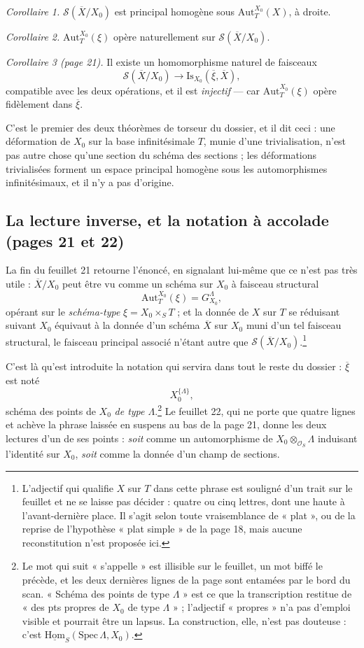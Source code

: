 \documentclass[11pt,a4paper]{article}
\begin{document}
\emph{Corollaire 1.} $\mathcal{S}(\overline{X}/X_{0})$ est principal homogène
sous $\mathrm{Aut}^{X_0}_{T}(X)$, à droite.

\emph{Corollaire 2.} $\mathrm{Aut}^{X_0}_{T}(\xi)$ opère naturellement sur
$\mathcal{S}(\overline{X}/X_{0})$.

\emph{Corollaire 3 (page 21).} Il existe un homomorphisme naturel de faisceaux
\[
  \mathcal{S}(\overline{X}/X_{0}) \longrightarrow
  \mathrm{Is}_{X_{0}}(\overline{\xi}, \overline{X}) ,
\]
compatible avec les deux opérations, et il est \emph{injectif} — car
$\mathrm{Aut}^{X_0}_{T}(\xi)$ opère fidèlement dans $\overline{\xi}$.

C'est le premier des deux théorèmes de torseur du dossier, et il dit ceci : une
déformation de $X_0$ sur la base infinitésimale $T$, munie d'une trivialisation,
n'est pas autre chose qu'une section du schéma des sections ; les déformations
trivialisées forment un espace principal homogène sous les automorphismes
infinitésimaux, et il n'y a pas d'origine.

\subsection*{La lecture inverse, et la notation à accolade (pages 21 et 22)}

La fin du feuillet 21 retourne l'énoncé, en signalant lui-même que ce n'est pas
très utile : $\overline{X}/X_{0}$ peut être vu comme un schéma sur $X_0$ à
faisceau structural
\[
  \mathrm{Aut}^{X_0}_{T}(\xi) = G^{\Lambda}_{X_{0}} ,
\]
opérant sur le \emph{schéma-type} $\xi = X_{0} \times_{S} T$ ; et la donnée de
$X$ sur $T$ se réduisant suivant $X_0$ équivaut à la donnée d'un schéma
$\overline{X}$ sur $X_{0}$ muni d'un tel faisceau structural, le faisceau
principal associé n'étant autre que
$\mathcal{S}(\overline{X}/X_{0})$.\footnote{L'adjectif qui qualifie $X$ sur $T$
dans cette phrase est souligné d'un trait sur le feuillet et ne se laisse pas
décider : quatre ou cinq lettres, dont une haute à l'avant-dernière place. Il
s'agit selon toute vraisemblance de « plat », ou de la reprise de l'hypothèse
« plat simple » de la page 18, mais aucune reconstitution n'est proposée ici.}

C'est là qu'est introduite la notation qui servira dans tout le reste du
dossier : $\overline{\xi}$ est noté
\[
  X_{0}^{\{\Lambda\}} ,
\]
schéma des points de $X_0$ \emph{de type $\Lambda$}.\footnote{Le mot qui suit
« s'appelle » est illisible sur le feuillet, un mot biffé le précède, et les
deux dernières lignes de la page sont entamées par le bord du scan. « Schéma des
points de type $\Lambda$ » est ce que la transcription restitue de « des pts
propres de $X_0$ de type $\Lambda$ » ; l'adjectif « propres » n'a pas d'emploi
visible et pourrait être un lapsus. La construction, elle, n'est pas douteuse :
c'est $\underline{\mathrm{Hom}}_{S}(\mathrm{Spec}\,\Lambda, X_0)$.} Le feuillet
22, qui ne porte que quatre lignes et achève la phrase laissée en suspens au bas
de la page 21, donne les deux lectures d'un de ses points : \emph{soit} comme un
automorphisme de $X_{0} \otimes_{\mathcal{O}_S} \Lambda$ induisant l'identité
sur $X_{0}$, \emph{soit} comme la donnée d'un champ de sections.
\end{document}
